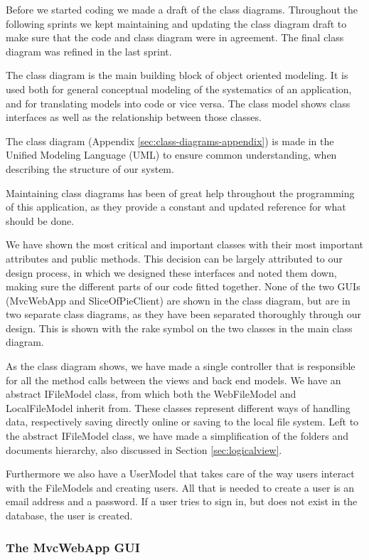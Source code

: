 Before we started coding we made a draft of the class diagrams. Throughout the following sprints we kept maintaining and updating the class diagram
draft to make sure that the code and class diagram were in agreement. The final class diagram was refined in the last sprint.

The class diagram is the main building block of object oriented modeling. It is used both for general conceptual modeling of the systematics 
of an application, and for translating models into code or vice versa. The class model
shows class interfaces as well as the relationship between those classes.

The class diagram (Appendix \ref{sec:class-diagrams-appendix}) is made in the Unified Modeling Language (UML) to ensure common understanding, when describing the structure of our system.

Maintaining class diagrams has been of great help throughout the programming of this application, as they provide a constant and updated reference
for what should be done.

We have shown the most critical and important classes with their most important attributes and public methods. This decision can be largely attributed
to our design process, in which we designed these interfaces and noted them down, making sure the different parts of our code fitted together.
None of the two GUIs (MvcWebApp and SliceOfPieClient) are shown in the class diagram, but are in two separate class diagrams, as they have been separated
thoroughly through our design. This is shown with the rake symbol on the two classes in the main class diagram.

As the class diagram shows, we have made a single controller that is responsible for all the method calls between the views and back end models. We
have an abstract IFileModel class, from which both the WebFileModel and LocalFileModel inherit from. These classes represent different ways of handling
data, respectively saving directly online or saving to the local file system. Left to the abstract IFileModel class, we have
made a simplification of the folders and documents hierarchy, also discussed in Section \ref{sec:logicalview}.

Furthermore we also have a UserModel that takes care of the way users interact with the FileModels and creating users. All that is needed
to create a user is an email address and a password. If a user tries to sign in, but does not exist in the database, the user is created.

\subsubsection{The MvcWebApp GUI}

